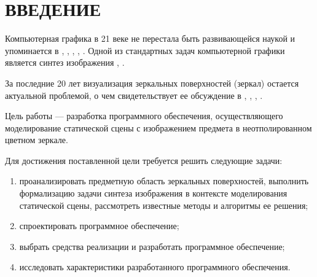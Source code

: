 \chapter*{ВВЕДЕНИЕ}

Компьютерная графика в 21 веке не перестала быть развивающейся наукой и упоминается в \cite{залогова2005компьютерная}, \cite{порев2002компьютерная}, \cite{тозик2013инженерная}, \cite{митин2016компьютерная}, \cite{турлюн2014компьютерная}. 
Одной из стандартных задач компьютерной графики является синтез изображения \cite{порев2002компьютерная}, \cite{куров}.

За последние 20 лет визуализация зеркальных поверхностей (зеркал) остается актуальной проблемой, о чем свидетельствует ее обсуждение в \cite{lensch2005realistic}, \cite{reshetouski2013mirrors}, \cite{miguel2014real}, \cite{hiranyachattada2021demonstration}.

Цель работы --- разработка программного обеспечения, осуществляющего моделирование статической сцены с изображением предмета в неотполированном цветном зеркале.

Для достижения поставленной цели требуется решить следующие задачи:

\begin{enumerate}
	\item проанализировать предметную область зеркальных поверхностей, выполнить формализацию задачи синтеза изображения в контексте моделирования статической сцены, рассмотреть известные методы и алгоритмы ее решения;
	\item спроектировать программное обеспечение;
	\item выбрать средства реализации и разработать программное обеспечение;
	\item исследовать характеристики разработанного программного обеспечения.
\end{enumerate}